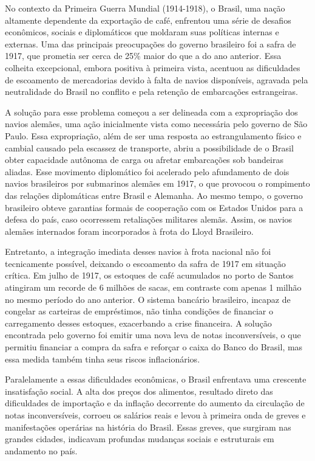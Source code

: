 \documentclass[a4paper,12pt]{article}[abntex2]
\begin{document}
No contexto da Primeira Guerra Mundial (1914-1918), o Brasil, uma nação altamente dependente da exportação de café, enfrentou uma série de desafios econômicos, sociais e diplomáticos que moldaram suas políticas internas e externas. Uma das principais preocupações do governo brasileiro foi a safra de 1917, que prometia ser cerca de 25\% maior do que a do ano anterior. Essa colheita excepcional, embora positiva à primeira vista, acentuou as dificuldades de escoamento de mercadorias devido à falta de navios disponíveis, agravada pela neutralidade do Brasil no conflito e pela retenção de embarcações estrangeiras.

A solução para esse problema começou a ser delineada com a expropriação dos navios alemães, uma ação inicialmente vista como necessária pelo governo de São Paulo. Essa expropriação, além de ser uma resposta ao estrangulamento físico e cambial causado pela escassez de transporte, abriu a possibilidade de o Brasil obter capacidade autônoma de carga ou afretar embarcações sob bandeiras aliadas. Esse movimento diplomático foi acelerado pelo afundamento de dois navios brasileiros por submarinos alemães em 1917, o que provocou o rompimento das relações diplomáticas entre Brasil e Alemanha. Ao mesmo tempo, o governo brasileiro obteve garantias formais de cooperação com os Estados Unidos para a defesa do país, caso ocorressem retaliações militares alemãs. Assim, os navios alemães internados foram incorporados à frota do Lloyd Brasileiro.

Entretanto, a integração imediata desses navios à frota nacional não foi tecnicamente possível, deixando o escoamento da safra de 1917 em situação crítica. Em julho de 1917, os estoques de café acumulados no porto de Santos atingiram um recorde de 6 milhões de sacas, em contraste com apenas 1 milhão no mesmo período do ano anterior. O sistema bancário brasileiro, incapaz de congelar as carteiras de empréstimos, não tinha condições de financiar o carregamento desses estoques, exacerbando a crise financeira. A solução encontrada pelo governo foi emitir uma nova leva de notas inconversíveis, o que permitiu financiar a compra da safra e reforçar o caixa do Banco do Brasil, mas essa medida também tinha seus riscos inflacionários.

Paralelamente a essas dificuldades econômicas, o Brasil enfrentava uma crescente insatisfação social. A alta dos preços dos alimentos, resultado direto das dificuldades de importação e da inflação decorrente do aumento da circulação de notas inconversíveis, corroeu os salários reais e levou à primeira onda de greves e manifestações operárias na história do Brasil. Essas greves, que surgiram nas grandes cidades, indicavam profundas mudanças sociais e estruturais em andamento no país.
\end{document}
